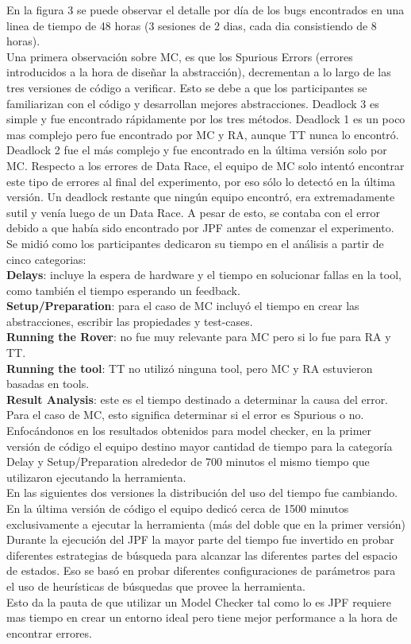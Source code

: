 \documentclass[runningheads]{llncs}
\begin{document}
En la figura 3 se puede observar el detalle por d\'ia de los bugs encontrados en una linea de tiempo de 48 horas (3 sesiones de 2 dias, cada dia consistiendo de 8 horas).\\ Una primera observaci\'on sobre MC, es que los Spurious Errors (errores introducidos a la hora de dise\~nar la abstracci\'on), decrementan a lo largo de las tres versiones de c\'odigo a verificar. Esto se debe a que los participantes se familiarizan con el c\'odigo y desarrollan mejores abstracciones. Deadlock 3 es simple y fue encontrado r\'apidamente por los tres m\'etodos. Deadlock 1 es un poco mas complejo pero fue encontrado por MC y RA, aunque TT nunca lo encontr\'o. Deadlock 2 fue el m\'as complejo y fue encontrado en la \'ultima versi\'on solo por MC. Respecto a los errores de Data Race, el equipo de MC solo intent\'o encontrar este tipo de errores al final del experimento, por eso s\'olo lo detect\'o en la \'ultima versi\'on. Un deadlock restante que ning\'un equipo encontr\'o, era extremadamente sutil y ven\'ia luego de un Data Race. A pesar de esto, se contaba con el error debido a que hab\'ia sido encontrado por JPF antes de comenzar el experimento.\\
Se midi\'o como los participantes dedicaron su tiempo en el an\'alisis a partir de cinco categorias:\\
\textbf{Delays}: incluye la espera de hardware y el tiempo en solucionar fallas en la tool, como tambi\'en el tiempo esperando un feedback.\\
\textbf{Setup/Preparation}: para el caso de MC incluy\'o el tiempo en crear las abstracciones, escribir las propiedades y test-cases.\\
\textbf{Running the Rover}: no fue muy relevante para MC pero si lo fue para RA y TT.\\
\textbf{Running the tool}: TT no utiliz\'o ninguna tool, pero MC y RA estuvieron basadas en tools.\\
\textbf{Result Analysis}: este es el tiempo destinado a determinar la causa del error. Para el caso de MC, esto significa determinar si el error es Spurious o no.\\
Enfoc\'andonos en los resultados obtenidos para model checker,  en la primer versi\'on de c\'odigo el equipo destino mayor cantidad de tiempo para la categor\'ia Delay y Setup/Preparation alrededor de 700 minutos el mismo tiempo que utilizaron ejecutando la herramienta.\\
En las siguientes dos versiones la distribuci\'on del uso del tiempo fue cambiando. En la \'ultima versi\'on de c\'odigo el equipo dedic\'o cerca de 1500 minutos exclusivamente a ejecutar la herramienta (m\'as del doble que en la primer versi\'on)
Durante la ejecuci\'on del JPF la mayor parte del tiempo fue invertido en probar diferentes estrategias de b\'usqueda para alcanzar las diferentes partes del espacio de estados. Eso se bas\'o en probar diferentes configuraciones de par\'ametros para el uso de heur\'isticas de b\'usquedas que provee la herramienta.\\
Esto da la pauta de que utilizar un Model Checker tal como lo es JPF requiere mas tiempo en crear un entorno ideal pero tiene mejor performance a la hora de encontrar errores.
\end{document}
